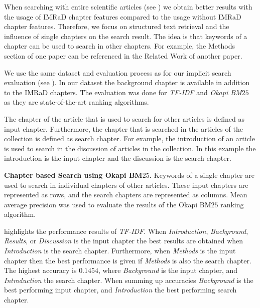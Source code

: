 When searching with entire scientific articles (see ) we obtain better results with the usage of IMRaD chapter features compared to the usage without IMRaD chapter features. Therefore, we focus on structured text retrieval and the influence of single chapters on the search result. The idea is that keywords of a chapter can be used to search in other chapters. For example, the Methods section of one paper can be referenced in the Related Work of another paper.

We use the same dataset and evaluation process as for our implicit search evaluation (see ). In our dataset the background chapter is available in addition to the IMRaD chapters. The evaluation was done for \textit{TF-IDF} and \textit{Okapi BM$25$} as they are state-of-the-art ranking algorithms.

The chapter of the article that is used to search for other articles is defined as input chapter. Furthermore, the chapter that is searched in the articles of the collection is defined as search chapter. For example, the introduction of an article is used to search in the discussion of articles in the collection. In this example the introduction is the input chapter and the discussion is the search chapter.

\begin{table}[b!]
\vrule{}\vrule
  \caption[Chapter based Search using Okapi BM$25$]{\textbf{Chapter based Search using Okapi BM$25$.} Keywords of a single chapter are used to search in individual chapters of other articles. These input chapters are represented as rows, and the search chapters are represented as columns. Mean average precision was used to evaluate the results of the Okapi BM$25$ ranking algorithm.}
  \label{tbl:chapter_based_okapi}
\end{table}

 highlights the performance results of \textit{TF-IDF}. When \textit{Introduction}, \textit{Background}, \textit{Results}, or \textit{Discussion} is the input chapter the best results are obtained when \textit{Introduction} is the search chapter. Furthermore, when \textit{Methods} is the input chapter then the best performance is given if \textit{Methods} is also the search chapter. The highest accuracy is $0.1454$, where \textit{Background} is the input chapter, and \textit{Introduction} the search chapter. When summing up accuracies \textit{Background} is the best performing input chapter, and \textit{Introduction} the best performing search chapter.

